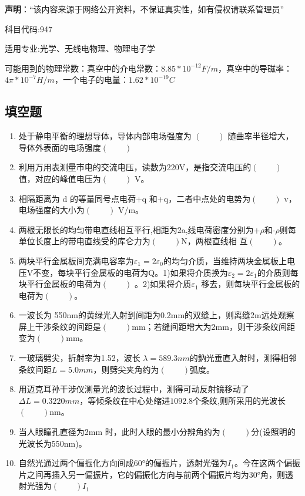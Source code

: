 
\textbf{声明}：“该内容来源于网络公开资料，不保证真实性，如有侵权请联系管理员”


科目代码:947


适用专业:光学、无线电物理、物理电子学


可能用到的物理常数：真空中的介电常数：$8.85*10^{-12}F/m$，真空中的导磁率：$4\pi*10^{-7}H/m$，一个电子的电量：$1.62*10^{-19}C$
\subsection{填空题}
\begin{enumerate}
\item  处于静电平衡的理想导体，导体内部电场强度为 $(\qquad)$ 随曲率半径增大，导体外表面的电场强度$(\qquad)$ 
\item 利用万用表测量市电的交流电压，读数为220V，是指交流电压的$(\qquad)$ 值，对应的峰值电压为$(\qquad)$ V。
\item 相隔距离为 d 的等量同号点电荷+q 和+q，二者中点处的电势为$(\qquad)$ v，电场强度的大小为$(\qquad)$ V/m。
\item 两根无限长的均匀带电直线相互平行,相距为2a,线电荷密度分别为+$\rho$和-$\rho$则每单位长度上的带电直线受的库仑力为$(\qquad)$N，两根直线相
互$(\qquad)$。
\item 两块平行金属板间充满电容率为$\varepsilon_1=2\varepsilon_0$的均匀介质，当维持两块金属板上电压V不变，每块平行金属板的电荷为Q。1)如果将介质换为$\varepsilon_2=2\varepsilon_1$的介质则每块平行金属板的电荷为$(\qquad)$
。2)如果将介质$\varepsilon_1$ 移去，则每块平行金属板的电荷为$(\qquad)$。
\item 一波长为 550nm的黄绿光入射到间距为0.2mm的双缝上，则离缝2m远处观察屏上干涉条纹的间距是$(\qquad)$mm；若缝间距增大为2mm，则干涉条纹间距变为$(\qquad)$mm。
\item 一玻璃劈尖，折射率为1.52，波长 $\lambda=589.3nm$的鈉光垂直入射时，测得相邻条纹间距$L=5.0mm$，则劈尖夹角约为$(\qquad)$弧度。
\item 用迈克耳孙干涉仪测量光的波长过程中，测得可动反射镜移动了$\Delta L=0.3220mm$，等倾条纹在中心处缩进$1092.8$个条纹,则所采用的光波长$(\qquad)$nm。
\item 当人眼瞳孔直径为2mm 时，此时人眼的最小分辨角约为$(\qquad)$分(设照明的光波长为550nm)。
\item 自然光通过两个偏振化方向间成60°的偏振片，透射光强为$I_1$。今在这两个偏振片之间再插入另一偏振片，它的偏振化方向与前两个偏振片均为30°角，则透射光强为$(\qquad)I_1$
\end{enumerate}
